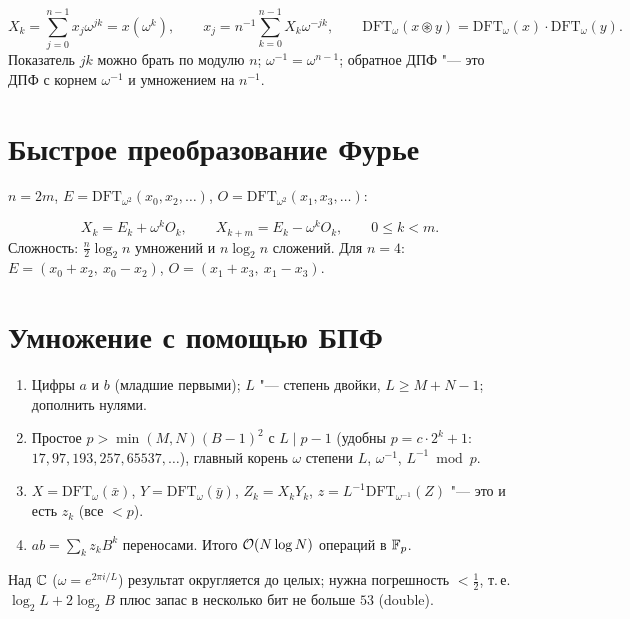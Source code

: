 \documentclass{ca-handout}
\begin{document}
\begin{reminder}[title={ДПФ, обратное ДПФ, теорема о свёртке}]
\[
  X_k = \sum_{j=0}^{n-1} x_j \omega^{jk} = x(\omega^k), \qquad
  x_j = n^{-1} \sum_{k=0}^{n-1} X_k \omega^{-jk}, \qquad
  \mathrm{DFT}_\omega(x \circledast y) = \mathrm{DFT}_\omega(x) \cdot \mathrm{DFT}_\omega(y).
\]
Показатель $jk$ можно брать по модулю $n$; $\omega^{-1} = \omega^{n-1}$; обратное ДПФ "--- это ДПФ
с корнем $\omega^{-1}$ и умножением на $n^{-1}$.
\end{reminder}

\section{Быстрое преобразование Фурье}
$n = 2m$, $E = \mathrm{DFT}_{\omega^2}(x_0, x_2, \dots)$, $O = \mathrm{DFT}_{\omega^2}(x_1, x_3, \dots)$:
\begin{reminder}[title={Бабочка Кули"--~Тьюки}]
\[
  X_k = E_k + \omega^k O_k, \qquad X_{k+m} = E_k - \omega^k O_k, \qquad 0 \le k < m.
\]
Сложность: $\frac n2 \log_2 n$ умножений и $n \log_2 n$ сложений. Для $n = 4$:
$E = (x_0 + x_2,\ x_0 - x_2)$, $O = (x_1 + x_3,\ x_1 - x_3)$.
\end{reminder}

\section{Умножение с помощью БПФ}
\begin{enumerate}
  \item Цифры $a$ и $b$ (младшие первыми); $L$ "--- степень двойки, $L \ge M + N - 1$; дополнить нулями.
  \item Простое $p > \min(M, N)(B - 1)^2$ с $L \mid p - 1$ (удобны $p = c \cdot 2^k + 1$:
    $17, 97, 193, 257, 65537, \dots$), главный корень $\omega$ степени $L$, $\omega^{-1}$, $L^{-1} \bmod p$.
  \item $X = \mathrm{DFT}_\omega(\bar x)$, $Y = \mathrm{DFT}_\omega(\bar y)$, $Z_k = X_k Y_k$,
    $z = L^{-1} \mathrm{DFT}_{\omega^{-1}}(Z)$ "--- это и есть $z_k$ (все $< p$).
  \item $ab = \sum_k z_k B^k$ переносами. Итого $\mathcal{O}(N \log N)$ операций в $\mathbb{F}_{p}$.
\end{enumerate}
Над $\mathbb{C}$ ($\omega = e^{2\pi i/L}$) результат округляется до целых; нужна погрешность $< \frac12$,
т.\,е. $\log_2 L + 2\log_2 B$ плюс запас в несколько бит не больше $53$ (double).
\end{document}
